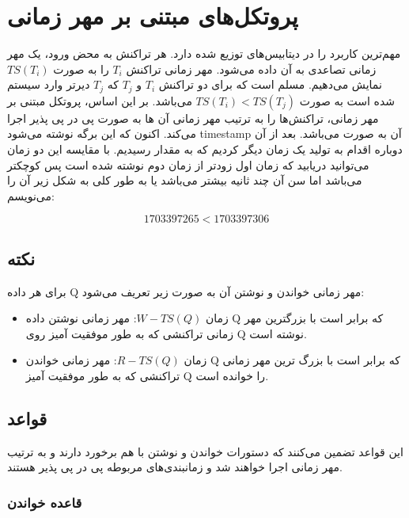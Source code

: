 \section{پروتکل‌های مبتنی بر مهر زمانی }

مهم‌ترین کاربرد را در دیتابیس‌های توزیع شده دارد. هر تراکنش به محض ورود، یک مهر
زمانی تصاعدی به آن داده می‌شود. مهر زمانی تراکنش $T_i$ را به صورت $TS(T_i)$
نمایش می‌دهیم. مسلم است که برای دو تراکنش $T_i$ و $T_j$ که $T_j$ دیرتر وارد
سیستم شده است به صورت $TS(T_i) < TS(T_j)$ می‌باشد. بر این اساس، پروتکل مبتنی بر
مهر زمانی، تراکنش‌ها را به  ترتیب مهر زمانی آن ها به صورت پی در پی پذیر اجرا
می‌کند. اکنون که این برگه نوشته می‌شود timestamp آن به صورت 
می‌باشد.  بعد از آن دوباره اقدام به تولید یک زمان دیگر کردیم که به مقدار
 رسیدیم. با مقایسه این دو زمان می‌توانید دریابید که زمان اول
زودتر از زمان دوم نوشته شده است پس کوچکتر می‌باشد اما سن آن چند ثانیه بیشتر
می‌باشد یا به طور کلی به شکل زیر آن را می‌نویسم:

\begin{equation}
    1703397265 < 1703397306 
\end{equation}

\subsection*{نکته}

برای هر داده Q مهر زمانی خواندن و نوشتن آن به صورت زیر تعریف می‌شود:

\begin{itemize}
    \item زمان $W-TS(Q)$: مهر زمانی نوشتن داده Q که برابر است با بزرگترین مهر
    زمانی تراکنشی که به طور موفقیت آمیز روی Q نوشته است.
    \item زمان $R-TS(Q)$: مهر زمانی خواندن Q که برابر است با بزرگ ترین مهر زمانی
    تراکنشی که به طور موفقیت آمیز Q را خوانده است.
\end{itemize}

\subsection{قواعد}

این قواعد تضمین می‌کنند که دستورات خواندن و نوشتن با هم برخورد دارند و به ترتیب
مهر زمانی اجرا خواهند شد و زمانبندی‌های مربوطه پی در پی پذیر هستند.

\subsubsection{قاعده خواندن}

